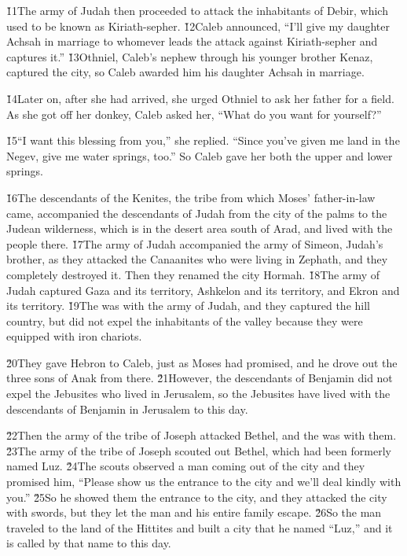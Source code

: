 \v{11}The army of Judah then proceeded to attack the inhabitants of Debir, which used to be known as Kiriath-sepher. \v{12}Caleb announced, ``I'll give my daughter Achsah in marriage to whomever leads the attack against Kiriath-sepher and captures it.'' \v{13}Othniel, Caleb's nephew through his younger brother Kenaz, captured the city, so Caleb awarded him his daughter Achsah in marriage.

\v{14}Later on, after she had arrived, she urged Othniel to ask her father for a field. As she got off her donkey, Caleb asked her, ``What do you want for yourself?''

\v{15}``I want this blessing from you,'' she replied. ``Since you've given me land in the Negev, give me water springs, too.'' So Caleb gave her both the upper and lower springs.

\v{16}The descendants of the Kenites, the tribe from which Moses' father-in-law came, accompanied the descendants of Judah from the city of the palms to the Judean wilderness, which is in the desert area south of Arad, and lived with the people there. \v{17}The army of Judah accompanied the army of Simeon, Judah's brother, as they attacked the Canaanites who were living in Zephath, and they completely destroyed it. Then they renamed the city Hormah. \v{18}The army of Judah captured Gaza and its territory, Ashkelon and its territory, and Ekron and its territory. \v{19}The  was with the army of Judah, and they captured the hill country, but did not expel the inhabitants of the valley because they were equipped with iron chariots.

\v{20}They gave Hebron to Caleb, just as Moses had promised, and he drove out the three sons of Anak from there. \v{21}However, the descendants of Benjamin did not expel the Jebusites who lived in Jerusalem, so the Jebusites have lived with the descendants of Benjamin in Jerusalem to this day.

\v{22}Then the army of the tribe of Joseph attacked Bethel, and the  was with them. \v{23}The army of the tribe of Joseph scouted out Bethel, which had been formerly named Luz. \v{24}The scouts observed a man coming out of the city and they promised him, ``Please show us the entrance to the city and we'll deal kindly with you.'' \v{25}So he showed them the entrance to the city, and they attacked the city with swords, but they let the man and his entire family escape. \v{26}So the man traveled to the land of the Hittites and built a city that he named ``Luz,'' and it is called by that name to this day.

